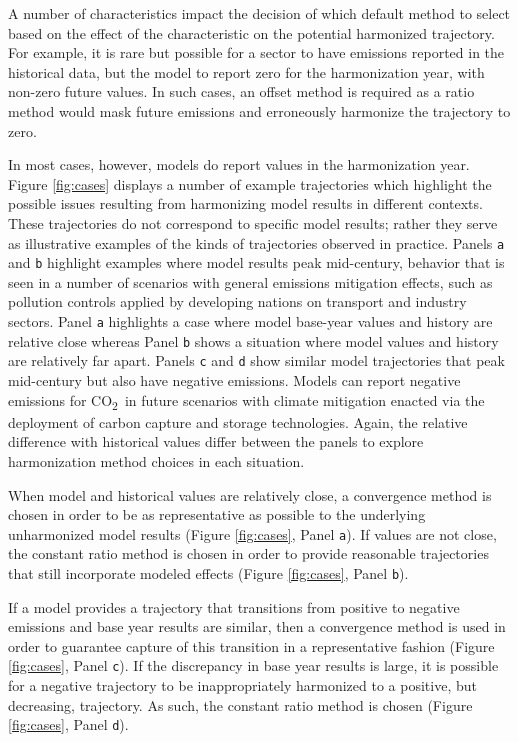 \documentclass[review]{elsarticle}
\newcommand{\code}[1]{\lstinline[basicstyle=\ttfamily\color{black}]|#1|}
\newcommand{\cotwo}{CO\textsubscript{2}~}
\begin{document}
A number of characteristics impact the decision of which default method to
select based on the effect of the characteristic on the potential harmonized
trajectory. For example, it is rare but possible for a sector to have emissions 
reported in the historical data, but the model to report zero for the harmonization year, 
with non-zero future values. In such cases,
an offset method is required as a ratio method would mask future emissions and
erroneously harmonize the trajectory to zero.

In most cases, however, models do report values in the harmonization
year. Figure \ref{fig:cases} displays a number of example trajectories which
highlight the possible issues resulting from harmonizing model results in
different contexts. These trajectories do not correspond to specific model
results; rather they serve as illustrative examples of the kinds of trajectories
observed in practice. Panels \code{a} and \code{b} highlight examples where
model results peak mid-century, behavior that is seen in a number of scenarios
with general emissions mitigation effects, such as pollution controls applied by
developing nations on transport and industry sectors. Panel \code{a} highlights
a case where model base-year values and history are relative close whereas Panel
\code{b} shows a situation where model values and history are relatively far
apart. Panels \code{c} and \code{d} show similar model trajectories that peak
mid-century but also have negative emissions. Models can report negative
emissions for \cotwo in future scenarios with
climate mitigation enacted via the deployment of carbon capture and
storage technologies. Again, the
relative difference with historical values differ between the panels to explore
harmonization method choices in each situation.

When model and historical values are relatively close, a convergence method is
chosen in order to be as representative as possible to the underlying
unharmonized model results (Figure \ref{fig:cases}, Panel \code{a}). If values
are not close, the constant ratio method is chosen in order to provide
reasonable trajectories that still incorporate modeled effects (Figure
\ref{fig:cases}, Panel \code{b}).

If a model provides a trajectory that transitions from positive to negative
emissions and base year results are similar, then a convergence method is used
in order to guarantee capture of this transition in a representative fashion
(Figure \ref{fig:cases}, Panel \code{c}). If the discrepancy in base year
results is large, it is possible for a negative trajectory to be inappropriately
harmonized to a positive, but decreasing, trajectory. As such, the constant
ratio method is chosen (Figure \ref{fig:cases}, Panel \code{d}).
\end{document}

